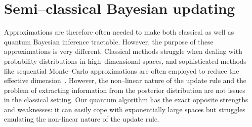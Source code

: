 \documentclass[aps,amsmath,onecolumn,amssymb,notitlepage]{revtex4-1}
\begin{document}
%


\section{Semi--classical Bayesian updating}
Approximations are therefore often needed to make both classical as well as quantum Bayesian inference tractable.  However, the purpose of these approximations is very different.  Classical methods struggle when dealing with probability distributions in high--dimensional spaces, and sophisticated methods like sequential Monte--Carlo approximations are often employed to reduce the effective dimension~\cite{liu_combined_2001,minka2001expectation,van2000unscented}.  However, the non--linear nature of the update rule and the problem of extracting information from the posterior distribution are not issues in the classical setting.  Our quantum algorithm has the exact opposite strengths and weaknesses: it can easily cope with exponentially large spaces but struggles emulating the non-linear nature of the update rule.
\end{document}
